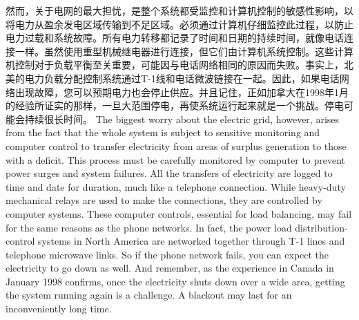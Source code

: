 \begin{paracol}{2}
\switchcolumn*
然而，关于电网的最大担忧，是整个系统都受监控和计算机控制的敏感性影响，以将电力从盈余发电区域传输到不足区域。必须通过计算机仔细监控此过程，以防止电力过载和系统故障。所有电力转移都记录了时间和日期的持续时间，就像电话连接一样。虽然使用重型机械继电器进行连接，但它们由计算机系统控制。这些计算机控制对于负载平衡至关重要，可能因与电话网络相同的原因而失败。事实上，北美的电力负载分配控制系统通过T-1线和电话微波链接在一起。因此，如果电话网络出现故障，您可以预期电力也会停止供应。并且记住，正如加拿大在1998年1月的经验所证实的那样，一旦大范围停电，再使系统运行起来就是一个挑战。停电可能会持续很长时间。
\switchcolumn
The biggest worry about the electric grid, however, arises from the fact that the whole system is subject to sensitive monitoring and computer control to transfer electricity from areas of surplus generation to those with a deficit. This process must be carefully monitored by computer to prevent power surges and system failures. All the transfers of electricity are logged to time and date for duration, much like a telephone connection. While heavy-duty mechanical relays are used to make the connections, they are controlled by computer systems. These computer controls, essential for load balancing, may fail for the same reasons as the phone networks. In fact, the power load distribution-control systems in North America are networked together through T-1 lines and telephone microwave links. So if the phone network fails, you can expect the electricity to go down as well. And remember, as the experience in Canada in January 1998 confirms, once the electricity shuts down over a wide area, getting the system running again is a challenge. A blackout may last for an inconveniently long time.
\end{paracol}

